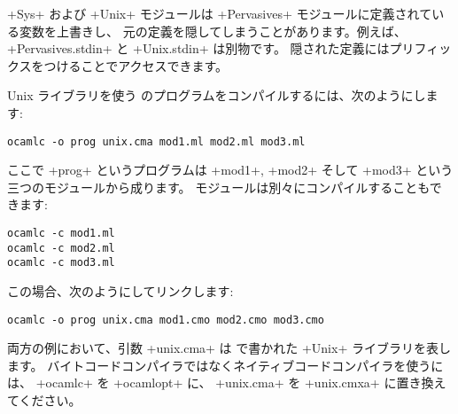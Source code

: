 \ml+Sys+ および \ml+Unix+ モジュールは \ml+Pervasives+ モジュールに定義されている変数を上書きし、
元の定義を隠してしまうことがあります。例えば、 \ml+Pervasives.stdin+ と \ml+Unix.stdin+ は別物です。
隠された定義にはプリフィックスをつけることでアクセスできます。

Unix ライブラリを使う \ocaml のプログラムをコンパイルするには、次のようにします:
%
\begin{lstlisting}
ocamlc -o prog unix.cma mod1.ml mod2.ml mod3.ml
\end{lstlisting}
%
ここで \ml+prog+ というプログラムは \ml+mod1+, \ml+mod2+ そして \ml+mod3+ という三つのモジュールから成ります。
モジュールは別々にコンパイルすることもできます:
%
\begin{lstlisting}
ocamlc -c mod1.ml
ocamlc -c mod2.ml
ocamlc -c mod3.ml
\end{lstlisting}
%
この場合、次のようにしてリンクします:
%
\begin{lstlisting}
ocamlc -o prog unix.cma mod1.cmo mod2.cmo mod3.cmo
\end{lstlisting}
%
両方の例において、引数 \ml+unix.cma+ は \ocaml で書かれた \ml+Unix+ ライブラリを表します。
バイトコードコンパイラではなくネイティブコードコンパイラを使うには、 \ml+ocamlc+ を \ml+ocamlopt+ に、
\ml+unix.cma+ を \ml+unix.cmxa+ に置き換えてください。


